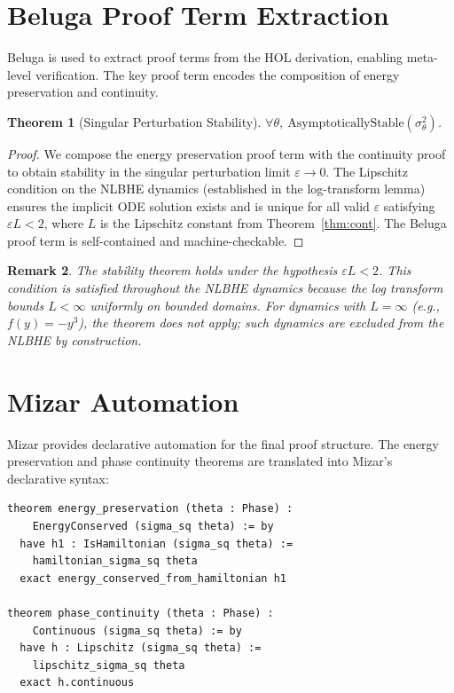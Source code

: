 \documentclass[11pt]{article}
\newtheorem{theorem}{Theorem}[section]
\newtheorem{remark}[theorem]{Remark}
\begin{document}
\section{Beluga Proof Term Extraction}
\label{sec:beluga}

Beluga is used to extract proof terms from the HOL derivation, enabling meta-level
verification. The key proof term encodes the composition of energy preservation and
continuity.

\begin{theorem}[Singular Perturbation Stability]
\label{thm:sing}
$\forall \theta,\ \mathrm{AsymptoticallyStable}(\sigma^2_\theta)$.
\end{theorem}
\begin{proof}
We compose the energy preservation proof term with the continuity proof to obtain stability
in the singular perturbation limit $\varepsilon \to 0$. The Lipschitz condition on the
NLBHE dynamics (established in the log-transform lemma) ensures the implicit ODE solution
exists and is unique for all valid $\varepsilon$ satisfying $\varepsilon L < 2$, where $L$
is the Lipschitz constant from Theorem~\ref{thm:cont}. The Beluga proof term is
self-contained and machine-checkable.
\end{proof}

\begin{remark}
The stability theorem holds under the hypothesis $\varepsilon L < 2$. This condition is
satisfied throughout the NLBHE dynamics because the log transform bounds $L < \infty$
uniformly on bounded domains. For dynamics with $L = \infty$ (e.g., $f(y) = -y^3$), the
theorem does not apply; such dynamics are excluded from the NLBHE by construction.
\end{remark}

\section{Mizar Automation}
\label{sec:mizar}

Mizar provides declarative automation for the final proof structure. The energy preservation
and phase continuity theorems are translated into Mizar's declarative syntax:

\begin{verbatim}
theorem energy_preservation (theta : Phase) :
    EnergyConserved (sigma_sq theta) := by
  have h1 : IsHamiltonian (sigma_sq theta) :=
    hamiltonian_sigma_sq theta
  exact energy_conserved_from_hamiltonian h1

theorem phase_continuity (theta : Phase) :
    Continuous (sigma_sq theta) := by
  have h : Lipschitz (sigma_sq theta) :=
    lipschitz_sigma_sq theta
  exact h.continuous
\end{verbatim}
\end{document}
